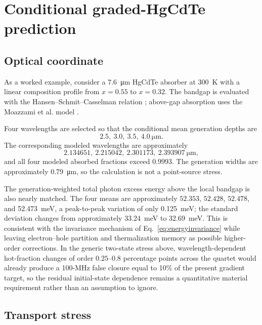 \documentclass[11pt]{article}
\begin{document}
\section{Conditional graded-HgCdTe prediction}

\subsection{Optical coordinate}

As a worked example, consider a \SI{7.6}{\micro\meter} HgCdTe absorber at \SI{300}{K} with a linear composition profile from $x=0.55$ to $x=0.32$. The bandgap is evaluated with the Hansen--Schmit--Casselman relation \cite{Hansen1982}; above-gap absorption uses the Moazzami et al. model \cite{Moazzami2005}.

Four wavelengths are selected so that the conditional mean generation depths are
\begin{equation}
2.5,\ 3.0,\ 3.5,\ 4.0\ \si{\micro\meter}.
\end{equation}
The corresponding modeled wavelengths are approximately
\begin{equation}
2.134651,\ 2.215042,\ 2.301173,\ 2.393907\ \si{\micro\meter},
\end{equation}
and all four modeled absorbed fractions exceed $0.9993$. The generation widths are approximately \SI{0.79}{\micro\meter}, so the calculation is not a point-source stress.

The generation-weighted total photon excess energy above the local bandgap is also nearly matched. The four means are approximately $52.353$, $52.428$, $52.478$, and \SI{52.473}{meV}, a peak-to-peak variation of only \SI{0.125}{meV}; the standard deviation changes from approximately \SI{33.24}{meV} to \SI{32.69}{meV}. This is consistent with the invariance mechanism of Eq.~\eqref{eq:energyinvariance} while leaving electron--hole partition and thermalization memory as possible higher-order corrections. In the generic two-state stress above, wavelength-dependent hot-fraction changes of order $0.25$--$0.8$ percentage points across the quartet would already produce a 100-MHz false closure equal to 10\% of the present gradient target, so the residual initial-state dependence remains a quantitative material requirement rather than an assumption to ignore.

\subsection{Transport stress}
\end{document}
